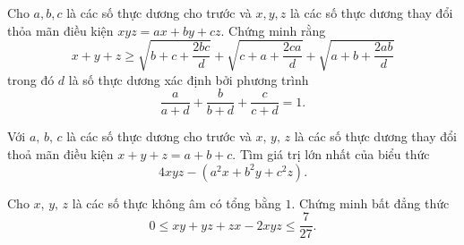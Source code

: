 \begin{bt} %
	Cho $ a,b,c $ là các số thực dương cho trước và $ x,y,z $ là các số thực dương thay đổi thỏa mãn điều kiện $ xyz=ax+by+cz $. Chứng minh rằng 
	$$x+y+z \geq \sqrt{b+c+\dfrac{2bc}{d}}+\sqrt{c+a+\dfrac{2ca}{d}}+\sqrt{a+b+\dfrac{2ab}{d}}$$
	trong đó $ d $ là số thực dương xác định bởi phương trình $$\dfrac{a}{a+d}+\dfrac{b}{b+d}+\dfrac{c}{c+d}=1. $$
\end{bt}

\begin{bt} %
	Với $a,\, b,\, c$ là các số thực dương cho trước và $x,\, y,\, z$ là các số thực dương thay đổi thoả mãn điều kiện $x + y + z = a + b + c$. Tìm giá trị lớn nhất của biểu thức $$4xyz - \left(a^2 x+b^2 y + c^2 z\right).$$
\end{bt}

\begin{bt} %
	Cho $x,\, y,\, z$ là các số thực không âm có tổng bằng $1$. Chứng minh bất đẳng thức 
	$$0 \leq xy+yz+zx -2xyz \leq \dfrac{7}{27}.$$
\end{bt}

